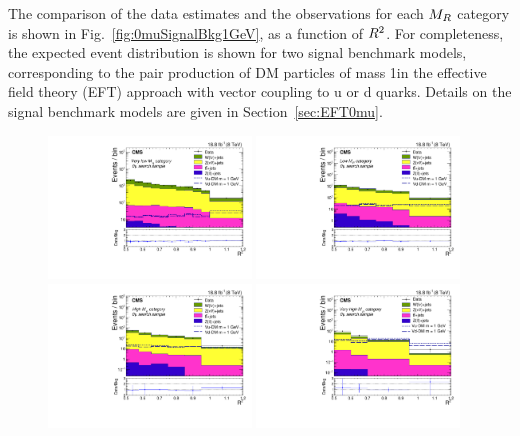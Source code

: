 The comparison of the data estimates and the observations for
each $M_R$ category is shown in
Fig.~\ref{fig:0muSignalBkg1GeV}, as a function of $R^2$. For
completeness, the expected event distribution is shown for two signal
benchmark models, corresponding to the pair production of DM particles
of mass 1\GeV in the effective field theory (EFT) approach with vector coupling to u or d quarks. Details on the signal benchmark models are
given in Section~\ref{sec:EFT0mu}.


\begin{figure}
 \centering
   \includegraphics[width=0.48\textwidth]{SignalBkgPlots/Data_MC_cat1_1_DoubleSignal_V.pdf}
   \includegraphics[width=0.48\textwidth]{SignalBkgPlots/Data_MC_cat2_1_DoubleSignal_V.pdf}
   \includegraphics[width=0.48\textwidth]{SignalBkgPlots/Data_MC_cat3_1_DoubleSignal_V.pdf}
   \includegraphics[width=0.48\textwidth]{SignalBkgPlots/Data_MC_cat4_1_DoubleSignal_V.pdf}

\end{figure}
